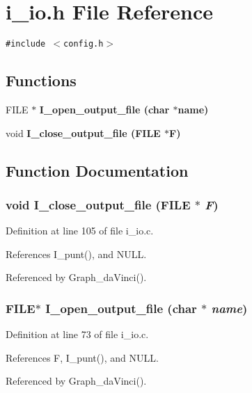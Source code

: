 \section{i\_\-io.h File Reference}
\label{i__io_8h}
{\tt \#include $<$config.h$>$}\par
\subsection*{Functions}
\begin{CompactItemize}
\item 
FILE $\ast$ \bf{I\_\-open\_\-output\_\-file} (char $\ast$\bf{name})
\item 
void \bf{I\_\-close\_\-output\_\-file} (FILE $\ast$\bf{F})
\end{CompactItemize}


\subsection{Function Documentation}
\subsubsection{\setlength{\rightskip}{0pt plus 5cm}void I\_\-close\_\-output\_\-file (FILE $\ast$ {\em F})}\label{i__io_8h_848046b76989ff3215134feef9387ce7}




Definition at line 105 of file i\_\-io.c.

References I\_\-punt(), and NULL.

Referenced by Graph\_\-da\-Vinci().
\subsubsection{\setlength{\rightskip}{0pt plus 5cm}FILE$\ast$ I\_\-open\_\-output\_\-file (char $\ast$ {\em name})}\label{i__io_8h_35fb56d4f414c161ac44e6d7b3b5594a}




Definition at line 73 of file i\_\-io.c.

References F, I\_\-punt(), and NULL.

Referenced by Graph\_\-da\-Vinci().